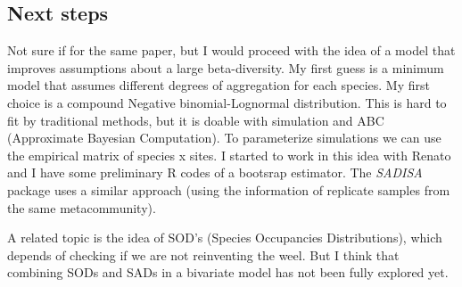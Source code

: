 \documentclass[12pt, A4]{article}\usepackage[]{graphicx}\usepackage[]{color}
\begin{document}


\subsection*{Next steps}

Not sure if for the same paper, but I would proceed with the idea of a model that improves
assumptions about a large beta-diversity. 
My first guess is a minimum model that assumes different degrees
of aggregation for each species. My first choice is a compound Negative binomial-Lognormal
distribution. This is hard to fit by traditional methods, but it is doable with 
simulation and ABC (Approximate Bayesian Computation). To parameterize simulations
we can use the empirical matrix of species x sites. 
I started to work in this idea with Renato and I have some preliminary R codes
of a bootsrap estimator. The \emph{SADISA} package uses a similar approach (using the information of 
replicate samples from the same metacommunity).

A related topic is the idea of SOD's (Species Occupancies Distributions),
which depends of checking if we are not reinventing the weel. But I think
that combining SODs and SADs in a bivariate model has not been fully explored
yet.


\end{document}
